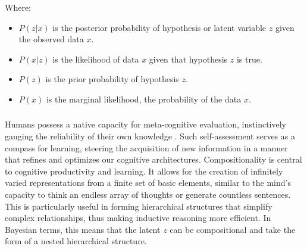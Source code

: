 Where:

    

\begin{itemize}
    \item \( P(z \vert x) \) is the posterior probability of hypothesis or latent variable \( z \) given the observed data \( x \).
    \item \( P(x \vert z) \) is the likelihood of data \( x \) given that hypothesis \( z \) is true.
    \item \( P(z) \) is the prior probability of hypothesis \( z \).
    \item \( P(x) \) is the marginal likelihood, the probability of the data \( x \).
\end{itemize}


\subsubsection{}
Humans possess a native capacity for meta-cognitive evaluation, instinctively gauging the reliability of their own knowledge \cite{Lake_Ullman_Tenenbaum_Gershman_2017}. Such self-assessment serves as a compass for learning, steering the acquisition of new information in a manner that refines and optimizes our cognitive architectures.
Compositionality is central to cognitive productivity and learning. It allows for the creation of infinitely varied representations from a finite set of basic elements, similar to the mind's capacity to think an endless array of thoughts or generate countless sentences. This is particularly useful in forming hierarchical structures that simplify complex relationships, thus making inductive reasoning more efficient.
In Bayesian terms, this means that the latent $z$ can be compositional and take the form of a nested hierarchical structure.



